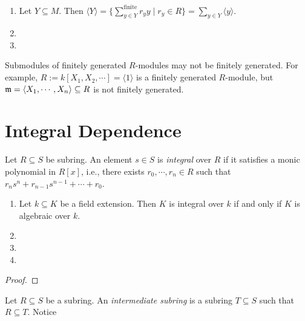 \begin{fact}
    \begin{enumerate}
        \item Let $Y \subseteq M$. Then $\langle Y \rangle = \{\sum_{y \in Y}^{\text{finite}} r_yy \mid r_y \in R\} = \sum_{y \in Y} \langle y \rangle$.
        \item 
        \item 
    \end{enumerate}
\end{fact}

\begin{example}
    Submodules of finitely generated $R$-modules may not be finitely generated. For example, $R := k[X_1,X_2,\cdots] = \langle 1 \rangle$ is a finitely generated $R$-module, but $\mathfrak{m} = \langle X_1,\cdots,X_n \rangle \subseteq R$ is not finitely generated.
\end{example}

\section{Integral Dependence}

\begin{definition}
    Let $R \subseteq S$ be subring. An element $s \in S$ is \emph{integral} over $R$ if it satisfies a monic polynomial in $R[x]$, i.e., there exists $r_0,\cdots,r_n \in R$ such that $r_ns^{n} + r_{n-1}s^{n-1} + \cdots + r_0$.
\end{definition}

\begin{example}
    \begin{enumerate}
        \item Let $k \subseteq K$ be a field extension. Then $K$ is integral over $k$ if and only if $K$ is algebraic over $k$.
        \item
        \item 
        \item 
    \end{enumerate}
\end{example}

\begin{proof}
\end{proof}

\begin{definition}
    Let $R \subseteq S$ be a subring. An \emph{intermediate subring} is a subring $T \subseteq S$ such that $R \subseteq T$. Notice
\end{definition}

